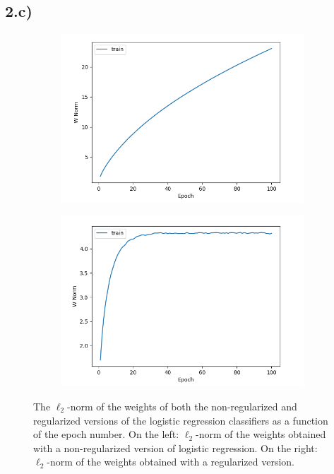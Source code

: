 \documentclass[a4paper, 12pt]{article}
\begin{document}
\subsection*{2.c)}
\vspace{-0.5 cm}
\begin{figure}[H]
    \centering
    \begin{subfigure}[b]{0.47\linewidth}
        \centering
        \includegraphics[width=\linewidth]{plot/q1_2a_ii.png}
        \label{fig:q1_2a_ii}
    \end{subfigure}
    \hfill
    \begin{subfigure}[b]{0.47\linewidth}
        \centering
        \includegraphics[width=\linewidth]{plot/q1_2b_ii.png}
        \label{fig:q1_2b_ii}
    \end{subfigure}
    \vspace{-0.4 cm}
    \caption{The $\ell_2$-norm of the
weights of both the non-regularized and regularized versions of the logistic regression classifiers as a function of the epoch number. On the left: $\ell_2$-norm of the
weights obtained with a non-regularized version of logistic regression. On the right: $\ell_2$-norm of the
weights obtained with a regularized version.}
    \label{fig:side_by_side}
\end{figure}
\end{document}
